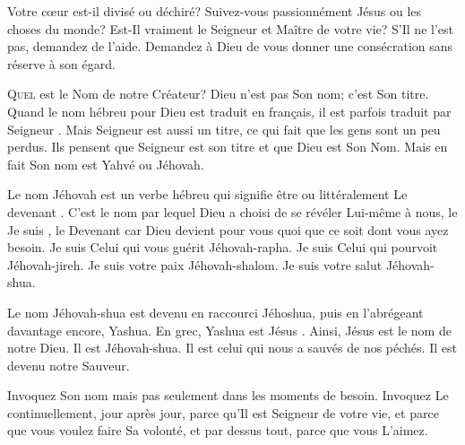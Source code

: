 Votre c\oe{}ur est-il divisé ou déchiré?
 Suivez-vous passionnément Jésus ou les choses du monde?
 Est-Il vraiment le Seigneur et Maître de votre vie?
 S'Il ne l'est pas, demandez de l'aide. Demandez à Dieu de vous donner
 une consécration sans réserve à son égard. 

\dvrule






\lettrine{Q}{uel} est le Nom de notre Créateur?
 \Og Dieu \Fg{} n'est pas Son nom; c'est Son titre.
 Quand le nom hébreu pour Dieu est traduit en fran\c{c}ais,
 il est parfois traduit par \Og Seigneur \Fg{}.
 Mais \Og Seigneur \Fg{} est aussi un titre,
 ce qui fait que les gens sont un peu perdus.
 Ils pensent que \Og Seigneur \Fg{} est son titre
 et que \Og Dieu \Fg{} est Son Nom.
 Mais en fait Son nom est Yahvé ou Jéhovah. 

Le nom Jéhovah est un verbe hébreu qui signifie \Og être \Fg{}
 ou littéralement \Og Le devenant \Fg{}.
 C'est le nom par lequel Dieu a choisi de se révéler Lui-même à nous,
 le \Og Je suis \Fg{}, le \Og Devenant \Fg{} car Dieu devient pour vous
 quoi que ce soit dont vous ayez besoin.
 Je suis Celui qui vous guérit \ocadr Jéhovah-rapha.
 Je suis Celui qui pourvoit \ocadr Jéhovah-jireh.
 Je suis votre paix \ocadr Jéhovah-shalom.
 Je suis votre salut \ocadr Jéhovah-shua. 

Le nom Jéhovah-shua est devenu en raccourci Jéhoshua,
 puis en l'abrégeant davantage encore, Yashua.
 En grec, Yashua est \Og Jésus \Fg{}.
 Ainsi, Jésus est le nom de notre Dieu. Il est Jéhovah-shua.
 Il est celui qui nous a sauvés de nos péchés. Il est devenu notre Sauveur.


Invoquez Son nom \ocadr mais pas seulement dans les moments de besoin.
 Invoquez Le continuellement, jour après jour, parce qu'Il est Seigneur
 de votre vie, et parce que vous voulez faire Sa volonté, et par dessus
 tout, parce que vous L'aimez.

